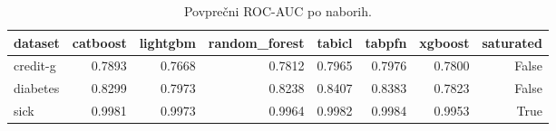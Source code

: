 \begin{table}[htbp]
\centering
\caption{Povprečni ROC-AUC po naborih.}
\label{tab:pivot}
\begin{tabular}{lrrrrrrr}
\hline
dataset & catboost & lightgbm & random\_forest & tabicl & tabpfn & xgboost & saturated \\
\hline
credit-g & 0.7893 & 0.7668 & 0.7812 & 0.7965 & 0.7976 & 0.7800 & False \\
diabetes & 0.8299 & 0.7973 & 0.8238 & 0.8407 & 0.8383 & 0.7823 & False \\
sick & 0.9981 & 0.9973 & 0.9964 & 0.9982 & 0.9984 & 0.9953 & True \\
\hline
\end{tabular}
\end{table}
